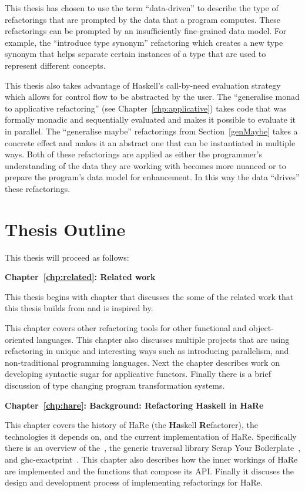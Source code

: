 This thesis has chosen to use the term ``data-driven'' to describe the type of refactorings that are prompted by the data that a program computes. These refactorings can be prompted by an insufficiently fine-grained data model. For example, the ``introduce type synonym'' refactoring which creates a new type synonym that helps separate certain instances of a type that are used to represent different concepts.

This thesis also takes advantage of Haskell's call-by-need evaluation strategy which allows for control flow to be abstracted by the user. The ``generalise monad to applicative refactoring'' (see Chapter~\ref{chp:applicative}) takes code that was formally monadic and sequentially evaluated and makes it possible to evaluate it in parallel. The ``generalise maybe'' refactorings from Section~\ref{genMaybe} takes a concrete effect and makes it an abstract one that can be instantiated in multiple ways. Both of these refactorings are applied as either the programmer's understanding of the data they are working with becomes more nuanced or to prepare the program's data model for enhancement. In this way the data ``drives'' these refactorings.

\section{Thesis Outline}

This thesis will proceed as follows:


\textbf{Chapter~\ref{chp:related}: Related work}

This thesis begins with chapter that discusses the some of the related work that this thesis builds from and is inspired by. 

This chapter covers other refactoring tools for other functional and object-oriented languages. This chapter also discusses multiple projects that are using refactoring in unique and interesting ways such as introducing parallelism, and non-traditional programming languages. Next the chapter describes work on developing syntactic sugar for applicative functors. Finally there is a brief discussion of type changing program transformation systems.


\textbf{Chapter~\ref{chp:hare}: Background: Refactoring Haskell in HaRe}

This chapter covers the history of HaRe (the \textbf{Ha}skell \textbf{Re}factorer), the technologies it depends on, and the current implementation of HaRe. Specifically there is an overview of the~\citep{ghcApi}, the generic traversal library Scrap Your Boilerplate~\citep{syb}, and ghc-exactprint~\citep{exactprint}. This chapter also describes how the inner workings of HaRe are implemented and the functions that compose its API. Finally it discuses the design and development process of implementing refactorings for HaRe.

